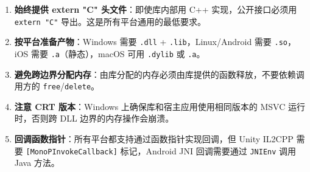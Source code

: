 \documentclass[12pt,a4paper,fontset=fandol]{ctexbook}
\newcommand{\cpp}[1]{C++#1}
\begin{document}
\begin{tcolorbox}[bestpractice={跨平台集成 extern "C" 库的建议}]
\begin{enumerate}[nosep]
\item \textbf{始终提供 extern "C" 头文件}：即使库内部用 \cpp{} 实现，公开接口必须用 \texttt{extern "C"} 导出。这是所有平台通用的最低要求。
\item \textbf{按平台准备产物}：Windows 需要 \texttt{.dll} + \texttt{.lib}，Linux/Android 需要 \texttt{.so}，iOS 需要 \texttt{.a}（静态），macOS 可用 \texttt{.dylib} 或 \texttt{.a}。
\item \textbf{避免跨边界分配内存}：由库分配的内存必须由库提供的函数释放，不要依赖调用方的 \texttt{free}/\allowbreak{}\texttt{delete}。
\item \textbf{注意 CRT 版本}：Windows 上确保库和宿主应用使用相同版本的 MSVC 运行时，否则跨 DLL 边界的内存操作会崩溃。
\item \textbf{回调函数指针}：所有平台都支持通过函数指针实现回调，但 Unity IL2CPP 需要 \texttt{[MonoPInvokeCallback]} 标记，Android JNI 回调需要通过 \texttt{JNIEnv} 调用 Java 方法。
\end{enumerate}
\end{tcolorbox}


\backmatter
\end{document}

